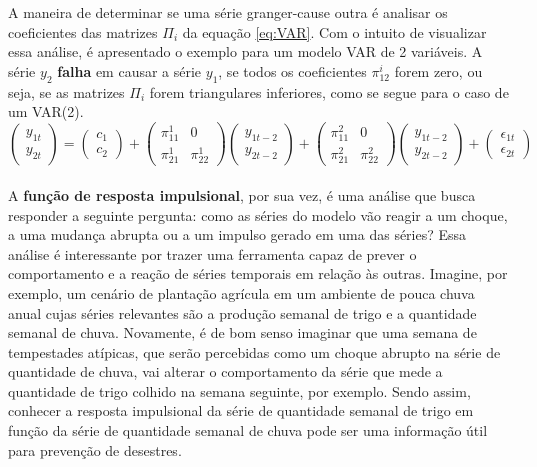 \documentclass[12pt]{article}
\begin{document}
	A maneira de determinar se uma série \textrm{granger-cause} outra é analisar os coeficientes das matrizes $\Pi_i$ da equação \ref{eq:VAR}. Com o intuito de visualizar essa análise, é apresentado o exemplo para um modelo VAR de 2 variáveis. A série $y_2$ \textbf{falha} em causar a série $y_1$, se todos os coeficientes $\pi_{12}^i$ forem zero, ou seja, se as matrizes $\Pi_i$ forem triangulares inferiores, como se segue para o caso de um VAR(2).
	\begin{equation*}
		\begin{pmatrix}
			y_{1t} \\
			y_{2t}
		\end{pmatrix}=
		\begin{pmatrix}
			c_{1} \\
			c_{2}
		\end{pmatrix}+
		\begin{pmatrix}
			\pi_{11}^{1} & 0\\
			\pi_{21}^{1} & \pi_{22}^{1}
		\end{pmatrix}
		\begin{pmatrix}
			y_{1t-2} \\
			y_{2t-2}
		\end{pmatrix}+
		\begin{pmatrix}
			\pi_{11}^{2} & 0\\
			\pi_{21}^{2} & \pi_{22}^2
		\end{pmatrix}
		\begin{pmatrix}
			y_{1t-2} \\
			y_{2t-2}
		\end{pmatrix}+
		\begin{pmatrix}
			\epsilon_{1t} \\
			\epsilon_{2t}
		\end{pmatrix}
	\end{equation*}\\
	
	A \textbf{função de resposta impulsional}, por sua vez, é uma análise que busca responder a seguinte pergunta: como as séries do modelo vão reagir a um choque, a uma mudança abrupta ou a um impulso gerado em uma das séries? Essa análise é interessante por trazer uma ferramenta capaz de prever o comportamento e a reação de séries temporais em relação às outras. Imagine, por exemplo, um cenário de plantação agrícula em um ambiente de pouca chuva anual cujas séries relevantes são a produção semanal de trigo e a quantidade semanal de chuva. Novamente, é de bom senso imaginar que uma semana de tempestades atípicas, que serão percebidas como um choque abrupto na série de quantidade de chuva, vai alterar o comportamento da série que mede a quantidade de trigo colhido na semana seguinte, por exemplo. Sendo assim, conhecer a resposta impulsional da série de quantidade semanal de trigo em função da série de quantidade semanal de chuva pode ser uma informação útil para prevenção de desestres.
	
\end{document}
